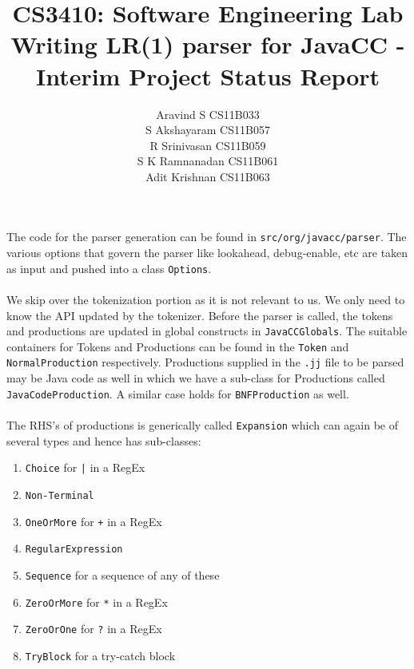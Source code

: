 \documentclass{article}
\begin{document}
\title{\textbf{CS3410: Software Engineering Lab}
\\
\textbf{Writing LR(1) parser for JavaCC - Interim Project Status Report}}
\author{ Aravind S CS11B033 \\
		 S Akshayaram CS11B057\\
		 R Srinivasan CS11B059\\
		 S K Ramnanadan CS11B061\\
		 Adit Krishnan  CS11B063\\
}
\maketitle
\noindent The code for the parser generation can be found in \texttt{src/org/javacc/parser}. The various options that govern the parser like lookahead, debug-enable, etc are taken as input and pushed into a class \texttt{Options}.\\\\We skip over the tokenization portion as it is not relevant to us. We only need to know the API updated by the tokenizer. Before the parser is called, the tokens and productions are updated in global constructs in \texttt{JavaCCGlobals}. The suitable containers for Tokens and Productions can be found in the \texttt{Token} and \texttt{NormalProduction} respectively. Productions supplied in the \texttt{.jj} file to be parsed may be Java code as well in which we have a sub-class for Productions called \texttt{JavaCodeProduction}. A similar case holds for \texttt{BNFProduction} as well.\\\\The RHS's of productions is generically called \texttt{Expansion} which can again be of several types and hence has sub-classes:\begin{enumerate}
\item \texttt{Choice} for \texttt{|} in a RegEx
\item \texttt{Non-Terminal}
\item \texttt{OneOrMore} for \texttt{+} in a RegEx
\item \texttt{RegularExpression}
\item \texttt{Sequence} for a sequence of any of these
\item \texttt{ZeroOrMore} for \texttt{*} in a RegEx
\item \texttt{ZeroOrOne} for \texttt{?} in a RegEx
\item \texttt{TryBlock} for a try-catch block
\end{enumerate}
\end{document}

